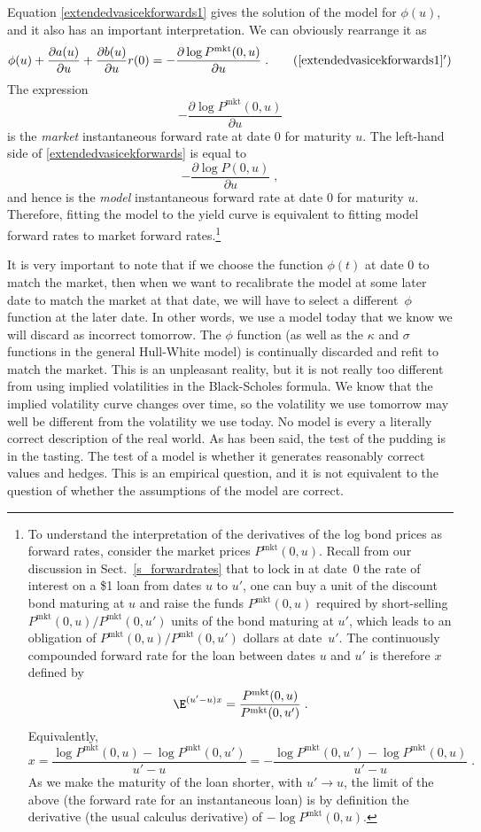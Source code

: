 Equation \eqref{extendedvasicekforwards1} gives the solution of the model for $\phi(u)$, and it also has an important interpretation.  We can obviously rearrange it as
\begin{equation}\label{extendedvasicekforwards}
\phi(u) +\frac{\partial a(u)}{\partial u} + \frac{\partial b(u)}{\partial u}r(0) = -\frac{ \partial \log P^{\text{mkt}}(0,u)}{\partial u}\;. \tag{\ref{extendedvasicekforwards1}$'$}
\end{equation}
The expression 
$$-\frac{\partial \log P^{\text{mkt}}(0,u)}{\partial u}$$
is the \emph{market} instantaneous forward rate at date 0 for maturity $u$.  The left-hand side of  \eqref{extendedvasicekforwards} is equal to
$$-\frac{\partial \log P(0,u)}{\partial u}\; ,$$
and hence is the \emph{model} instantaneous forward rate at date 0 for maturity $u$.  
Therefore, fitting the model to the yield curve is equivalent to fitting model forward rates to market forward rates.\footnote{To understand the interpretation of the derivatives of the log bond prices as forward rates, consider the market prices $P^{\text{mkt}}(0,u)$.   Recall from our discussion in Sect.~\ref{s_forwardrates} that to lock in at date~0 the rate of interest on a \$1 loan from dates $u$ to $u'$, one can buy a unit of the discount bond maturing at $u$ and raise the funds $P^{\text{mkt}}(0,u)$ required by short-selling $P^{\text{mkt}}(0,u)/P^{\text{mkt}}(0,u')$ units of the bond maturing at $u'$, which leads to an obligation of $P^{\text{mkt}}(0,u)/P^{\text{mkt}}(0,u')$ dollars at date~$u'$.  The continuously compounded forward rate for the loan between dates $u$ and $u'$ is therefore $x$ defined by
$$\E^{(u'-u)x} = \frac{P^{\text{mkt}}(0,u)}{P^{\text{mkt}}(0,u')}\; .$$
Equivalently,
$$x = \frac{\log P^{\text{mkt}}(0,u) -\log P^{\text{mkt}}(0,u')}{u'-u} = - \frac{\log P^{\text{mkt}}(0,u') -\log P^{\text{mkt}}(0,u)}{u'-u}\; .$$
As we make the maturity of the loan shorter, with $u' \rightarrow u$, the limit of the above (the forward rate for an instantaneous loan) is by definition the derivative (the usual calculus derivative) of $-\log P^{\text{mkt}}(0,u)$.}

It is very important to note that if we choose the function $\phi(t)$ at date 0 to match the market, then when we want to recalibrate the model at some later date to match the market at that date, we will have to select a different~$\phi$ function at the later date.  In other words, we use a model today that we know we will discard as incorrect tomorrow.  The $\phi$ function (as well as the $\kappa$ and $\sigma$ functions in the general Hull-White model) is continually discarded and refit to match the market.  This is an unpleasant reality, but it is not really too different from using implied volatilities in the Black-Scholes formula.  We know that the implied volatility curve changes over time, so the volatility we use tomorrow may well be different from the volatility we use today.  No model is every a literally correct description of the real world.  As has been said, the test of the pudding is in the tasting.  The test of a model is whether it generates reasonably correct values and hedges.  This is an empirical question, and it is not equivalent to the question of whether the assumptions of the model are correct.

